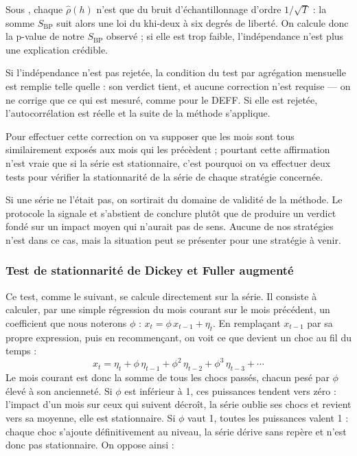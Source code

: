 Sous \Hzero{}, chaque $\hat\rho(h)$ n'est que du bruit d'échantillonnage
d'ordre $1/\sqrt{T}$ : la somme $S_{\mathrm{BP}}$ suit alors une loi du
khi-deux à six degrés de liberté. On calcule donc la p-value
de notre $S_{\mathrm{BP}}$ observé ; si elle est trop faible, l'indépendance
n'est plus une explication crédible.

Si l'indépendance n'est pas rejetée, la condition du test par
agrégation mensuelle est remplie telle quelle : son verdict tient, et aucune
correction n'est requise — on ne corrige que ce qui est mesuré, comme pour le
DEFF. Si elle est rejetée, l'autocorrélation est réelle et la suite de la
méthode s'applique.

Pour effectuer cette correction on va supposer que les mois sont tous
similairement exposés aux mois qui les précèdent ; pourtant cette affirmation
n'est vraie que si la série est stationnaire, c'est pourquoi on va effectuer
deux tests pour vérifier la stationnarité de la série de chaque stratégie
concernée.

Si une série ne l'était pas, on sortirait du domaine de validité de la
méthode. Le protocole la signale et s'abstient de conclure plutôt que de
produire un verdict fondé sur un impact moyen qui n'aurait pas de sens. Aucune
de nos stratégies n'est dans ce cas, mais la situation peut se présenter pour
une stratégie à venir.

\subsubsection*{Test de stationnarité de Dickey et Fuller augmenté}

Ce test, comme le suivant, se calcule directement sur la série.
Il consiste à calculer, par une simple régression du
mois courant sur le mois précédent, un coefficient que nous noterons \(\phi\) :
\(x_t = \phi\, x_{t-1} + \eta_t\).
En remplaçant \(x_{t-1}\) par sa propre expression, puis en recommençant, on
voit ce que devient un choc au fil du temps :
\[
  x_t = \eta_t + \phi\,\eta_{t-1} + \phi^2\,\eta_{t-2} + \phi^3\,\eta_{t-3} + \cdots
\]
Le mois courant est donc la somme de tous les chocs passés, chacun pesé par
\(\phi\) élevé à son ancienneté. Si \(\phi\) est inférieur à 1, ces puissances
tendent vers zéro : l'impact d'un mois sur ceux qui suivent décroît, la série
oublie ses chocs et revient vers sa moyenne, elle est stationnaire. Si \(\phi\)
vaut 1, toutes les puissances valent 1 : chaque choc s'ajoute définitivement au
niveau, la série dérive sans repère et n'est donc pas stationnaire.
On oppose ainsi :


